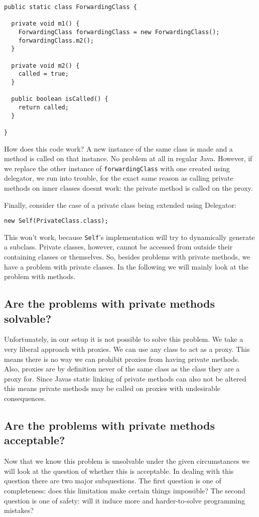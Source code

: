 \documentclass[a4paper,12pt]{book}
\begin{document}
\begin{verbatim}
public static class ForwardingClass {

  private void m1() {
    ForwardingClass forwardingClass = new ForwardingClass();
    forwardingClass.m2();
  }

  private void m2() {
    called = true;
  }
       
  public boolean isCalled() {
    return called;
  }
	    
}
\end{verbatim}

How does this code work? A new instance of the same class is made and a method is called on that instance. No problem at all in regular Java. However, if we replace the other instance of \verb|forwardingClass| with one created using delegator, we run into trouble, for the exact same reason as calling private methods on inner classes doesnt work: the private method is called on the proxy.

Finally, consider the case of a private class being extended using Delegator:

\begin{verbatim}
new Self(PrivateClass.class);
\end{verbatim}

This won't work, because \verb|Self|'s implementation will try to dynamically generate a subclass. Private classes, however, cannot be accessed from outside their containing classes or themselves. So, besides problems with private methods, we have a problem with private classes. In the following we will mainly look at the problem with methods. %

\subsection*{Are the problems with private methods solvable?}
Unfortunately, in our setup it is not possible to solve this problem. We take a very liberal approach with proxies. We can use any class to act as a proxy. This means there is no way we can prohibit proxies from having private methods. Also, proxies are by definition never of the same class as the class they are a proxy for. Since Javas static linking of private methods can also not be altered this means private methods may be called on proxies with undesirable consequences.

\subsection*{Are the problems with private methods acceptable?}
Now that we know this problem is unsolvable under the given circumstances we will look at the question of whether this is acceptable. In dealing with this question there are two major subquestions. The first question is one of completeness: does this limitation make certain things impossible? The second question is one of safety: will it induce more and harder-to-solve programming mistakes?
\end{document}
